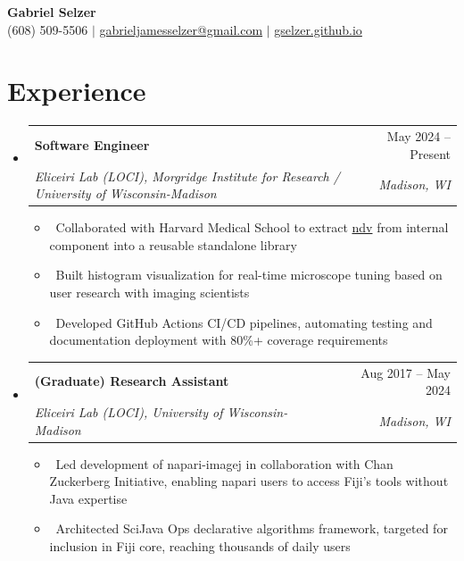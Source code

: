 \documentclass[letterpaper,10pt]{article}
\makeatletter
\newcommand{\resumeItem}[1]{\item\small{#1}}
\newcommand{\resumeSubheading}[4]{
\vspace{-1pt}\item
  \begin{tabular*}{0.97\textwidth}[t]{l@{\extracolsep{\fill}}r}
    \textbf{#1} & #2 \\
    \textit{#3} & \textit{#4} \\
  \end{tabular*}\vspace{-7pt}
}
\newcommand{\resumeSubHeadingList}{\begin{itemize}[leftmargin=0.15in, label={}]}
\newcommand{\resumeSubHeadingListEnd}{\end{itemize}}
\makeatother
\begin{document}
\begin{center}
  \textbf{\Huge Gabriel Selzer} \\
  \small (608) 509-5506 $|$ \href{mailto:gabrieljamesselzer@gmail.com}{gabrieljamesselzer@gmail.com} $|$ 
  \href{https://gselzer.github.io}{gselzer.github.io}
\end{center}


\section{Experience}
\resumeSubHeadingList
  \resumeSubheading
      {Software Engineer}{May 2024 -- Present}
      {Eliceiri Lab (LOCI), Morgridge Institute for Research / University of Wisconsin-Madison}{Madison, WI}
      \resumeSubHeadingList
          \resumeItem{\textbullet\ Collaborated with Harvard Medical School to extract \href{https://pyapp-kit.github.io/ndv/latest/}{ndv} from internal component into a reusable standalone library}
          \resumeItem{\textbullet\ Built histogram visualization for real-time microscope tuning based on user research with imaging scientists}
          \resumeItem{\textbullet\ Developed GitHub Actions CI/CD pipelines, automating testing and documentation deployment with 80\%+ coverage requirements}
      \resumeSubHeadingListEnd
  \resumeSubheading
      {(Graduate) Research Assistant}{Aug 2017 -- May 2024}
      {Eliceiri Lab (LOCI), University of Wisconsin-Madison}{Madison, WI}
      \resumeSubHeadingList
          \resumeItem{\textbullet\ Led development of napari-imagej in collaboration with Chan Zuckerberg Initiative, enabling napari users to access Fiji's tools without Java expertise}
          \resumeItem{\textbullet\ Architected SciJava Ops declarative algorithms framework, targeted for inclusion in Fiji core, reaching thousands of daily users}
      \resumeSubHeadingListEnd
\resumeSubHeadingListEnd
\end{document}
